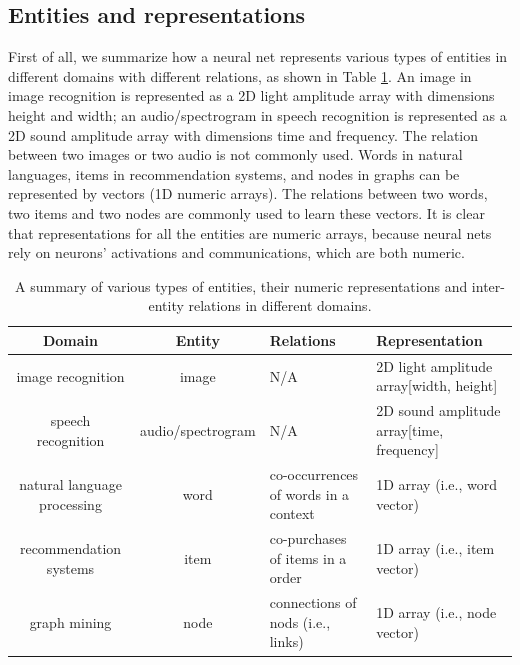 \documentclass[conference]{IEEEtran}
\begin{document}
\subsection{Entities and representations}
First of all, we summarize how a neural net represents various types of 
entities in different domains with different relations, as shown in 
Table \ref{tab:domains}.
An image in image recognition is represented as
a 2D light amplitude array with dimensions height and width;
an audio/spectrogram in speech recognition is represented as
a 2D sound amplitude array with dimensions time and frequency.
The relation between two images or two audio is not commonly used. 
Words in natural languages, items in recommendation systems, and nodes 
in graphs can be represented by vectors (1D numeric arrays).
The	relations between two words, two items and two nodes are commonly 
used to learn these vectors.
It is clear that representations for all the entities are numeric arrays, 
because neural nets rely on neurons' activations and communications, which 
are both numeric.
\begin{table}[!htb]
	\centering
	\caption{
		A summary of various types of entities, their numeric
		representations and inter-entity relations in different domains.
	}
	\begin{tabularx}{1\textwidth}{|c|c|X|X|} \hline \rowcolor{blue!40}
		Domain & Entity & Relations & Representation \\ \hline
		image recognition & image & N/A & 2D light amplitude array[width, height] \\ \hline
		speech recognition & audio/spectrogram  & N/A & 2D sound amplitude array[time, frequency] \\ \hline
		natural language processing & word   & co-occurrences of words in a context & 1D array (i.e., word vector) \\ \hline
		recommendation systems & item   & co-purchases of items in a order & 1D array (i.e., item vector) \\ \hline
		graph mining & node   & connections of nods (i.e., links) & 1D array (i.e., node vector) \\ \hline
	\end{tabularx}
	\label{tab:domains}
\end{table}
\end{document}
